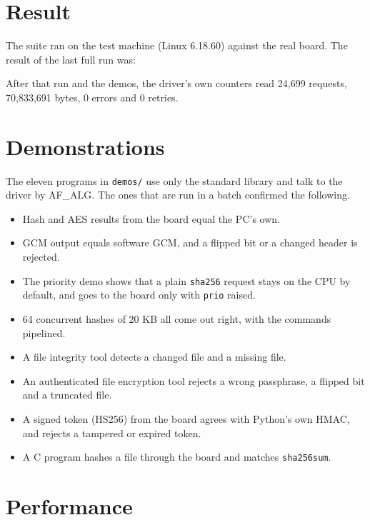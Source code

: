 \documentclass[11pt,a4paper,oneside]{report}
\newcommand{\code}[1]{\texttt{\small #1}}
\begin{document}
\section{Result}

The suite ran on the test machine (Linux 6.18.60) against the real board. The result of the last full run was:

\begin{center}
\end{center}

After that run and the demos, the driver's own counters read 24,699 requests, 70,833,691 bytes, 0 errors and 0 retries.

\section{Demonstrations}

The eleven programs in \code{demos/} use only the standard library and talk to the driver by AF\_ALG. The ones that are run in a batch confirmed the following.

\begin{itemize}
  \item Hash and AES results from the board equal the PC's own.
  \item GCM output equals software GCM, and a flipped bit or a changed header is rejected.
  \item The priority demo shows that a plain \code{sha256} request stays on the CPU by default, and goes to the board only with \code{prio} raised.
  \item 64 concurrent hashes of 20 KB all come out right, with the commands pipelined.
  \item A file integrity tool detects a changed file and a missing file.
  \item An authenticated file encryption tool rejects a wrong passphrase, a flipped bit and a truncated file.
  \item A signed token (HS256) from the board agrees with Python's own HMAC, and rejects a tampered or expired token.
  \item A C program hashes a file through the board and matches \code{sha256sum}.
\end{itemize}

\section{Performance}
\end{document}
